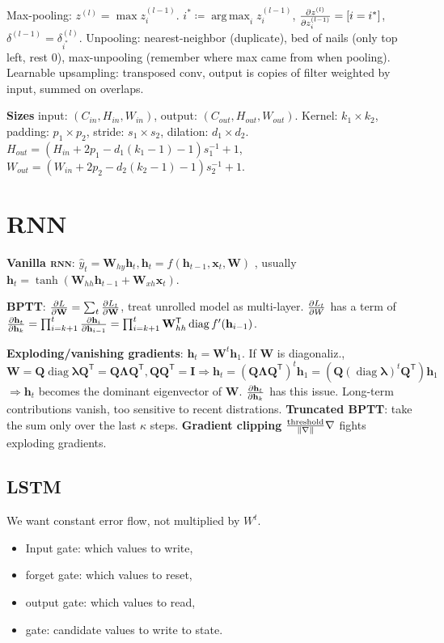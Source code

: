 \documentclass[11pt,landscape,a4paper,fleqn]{article}
\newcommand*{\tran}{^{\mathsf{T}}} %
\DeclareMathOperator{\diag}{\mathrm{diag}}
\DeclareMathOperator*{\argmax}{arg\,max}
\def\myvector#1{\mathbf{#1}}
\def\vh{{\myvector{h}}}
\def\vx{{\myvector{x}}}
\def\mymatrix#1{\mathbf{#1}}
\def\mI{{\mymatrix{I}}}
\def\mQ{{\mymatrix{Q}}}
\def\mW{{\mymatrix{W}}}
\begin{document}
\begin{multicols*}{4}
Max-pooling: $z^{(l)} = \max z_i^{(l - 1)}$. $i^* \coloneqq \argmax_i z_i^{(l - 1)}$,
$\pdv{z^{(l)}}{z_i^{(l - 1)}} = [i = i^*]$, $\delta^{(l - 1)} = \delta^{(l)}_{i^*}$.
Unpooling: nearest-neighbor (duplicate), bed of nails (only top left, rest 0), max-unpooling (remember where max came from when pooling).
Learnable upsampling: transposed conv, output is copies of filter weighted by input, summed on overlaps.

\textbf{Sizes}
input: $(C_{in}, H_{in}, W_{in})$, output: $(C_{out}, H_{out}, W_{out})$.
Kernel: $k_1 \times k_2$, padding: $p_1 \times p_2$, stride: $s_1 \times s_2$, dilation: $d_1 \times d_2$.
$H_{out} = (H_{in} + 2p_1 - d_1(k_1 - 1) - 1) s^{-1}_1 + 1$,
$W_{out} = (W_{in} + 2p_2 - d_2(k_2 - 1) - 1) s^{-1}_2 + 1$.

\section{RNN}

\textbf{Vanilla \textsc{rnn}}: $\hat{y}_t = \mW_{hy} \vh_t, \vh_t = f(\vh_{t-1}, \vx_t, \mW)$
, usually $\vh_t = \tanh(\mW_{hh} \vh_{t-1} + \mW_{xh}\vx_t)$.

\textbf{BPTT}: $\pdv{L}{\mW} = \sum_t \pdv{L_t}{\mW}$, treat unrolled model as multi-layer.
$\pdv{L_t}{W}$ has a term of $\pdv{\vh_t}{\vh_k} = \prod_{i = k + 1}^t \pdv{\vh_i}{\vh_{i-1}}
= \prod_{i = k + 1}^t \mW_{hh}\tran \diag f'(\vh_{i-1})$.

\textbf{Exploding/vanishing gradients}: $\vh_t = \mW^t \vh_1$.
If $\mW$ is diagonaliz., $\mW = \mQ \diag \bm\lambda \mQ\tran = \mQ \bm\Lambda \mQ\tran, \mQ \mQ\tran = \mI
\Rightarrow \vh_t = (\mQ\bm\Lambda \mQ\tran)^t \vh_1 = (\mQ (\diag \bm\lambda)^t \mQ\tran) \vh_1$
$\Rightarrow \vh_t$ becomes the dominant eigenvector of $\mW$.
$\pdv{\vh_t}{\vh_k}$ has this issue.
Long-term contributions vanish, too sensitive to recent distrations.
\textbf{Truncated BPTT}: take the sum only over the last $\kappa$ steps.
\textbf{Gradient clipping} $\frac{\mathrm{threshold}}{\norm{\nabla}} \nabla$ fights exploding gradients.


\subsection{LSTM}
We want constant error flow, not multiplied by $W^t$.
\begin{itemize}
    \item Input gate: which values to write,
    \item forget gate: which values to reset,
    \item output gate: which values to read,
    \item gate: candidate values to write to state.
\end{itemize}


\end{multicols*}
\end{document}
